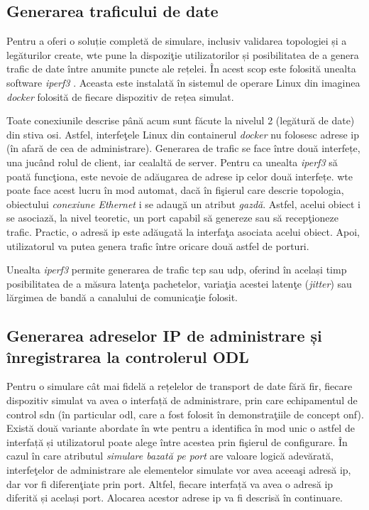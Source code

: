 \subsection{Generarea traficului de date}

Pentru a oferi o soluție completă de simulare, inclusiv validarea topologiei și a legăturilor create, \gls{wte} pune la dispoziţie utilizatorilor și posibilitatea de a genera trafic de date între anumite puncte ale rețelei. În acest scop este folosită unealta software \textit{iperf3} \cite{iperf32017, tirumala2005iperf}. Aceasta este instalată în sistemul de operare Linux din imaginea \textit{docker} folosită de fiecare dispozitiv de rețea simulat.

Toate conexiunile descrise până acum sunt făcute la nivelul 2 (legătură de date) din stiva \gls{osi}. Astfel, interfeţele Linux din containerul \textit{docker} nu folosesc adrese \gls{ip} (în afară de cea de administrare). Generarea de trafic se face între două interfețe, una jucând rolul de client, iar cealaltă de server. Pentru ca unealta \textit{iperf3} să poată funcţiona, este nevoie de adăugarea de adrese \gls{ip} celor două interfețe. \gls{wte} poate face acest lucru în mod automat, dacă în fişierul care descrie topologia, obiectului \textit{conexiune Ethernet} i se adaugă un atribut \textit{gazdă}. Astfel, acelui obiect i se asociază, la nivel teoretic, un port capabil să genereze sau să recepţioneze trafic. Practic, o adresă \gls{ip} este adăugată la interfaţa asociata acelui obiect. Apoi, utilizatorul va putea genera trafic între oricare două astfel de porturi. 

Unealta \textit{iperf3} permite generarea de trafic \gls{tcp} sau \gls{udp}, oferind în același timp posibilitatea de a măsura latenţa pachetelor, variaţia acestei latenţe (\textit{jitter}) sau lărgimea de bandă a canalului de comunicaţie folosit.

\subsection{Generarea adreselor IP de administrare și înregistrarea la controlerul ODL}

Pentru o simulare cât mai fidelă a rețelelor de transport de date fără fir, fiecare dispozitiv simulat va avea o interfață de administrare, prin care echipamentul de control \gls{sdn} (în particular \gls{odl}, care a fost folosit în demonstraţiile de concept \gls{onf}). Există două variante abordate în \gls{wte} pentru a identifica în mod unic o astfel de interfață și utilizatorul poate alege între acestea prin fişierul de configurare. În cazul în care atributul \textit{simulare bazată pe port} are valoare logică adevărată, interfeţelor de administrare ale elementelor simulate vor avea aceeaşi adresă \gls{ip}, dar vor fi diferenţiate prin port. Altfel, fiecare interfață va avea o adresă \gls{ip} diferită și același port. Alocarea acestor adrese \gls{ip} va fi descrisă în continuare.

